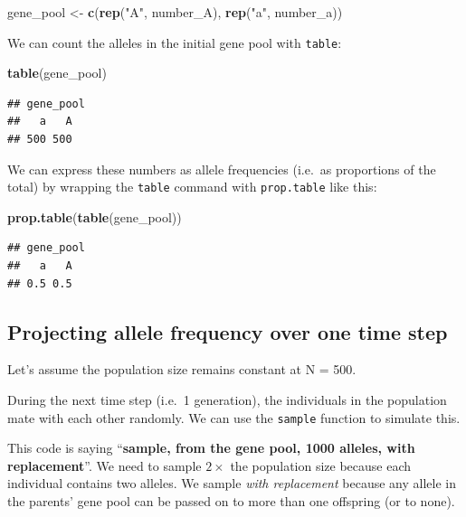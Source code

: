 \documentclass[
  a4paper]{book}
\newenvironment{Shaded}{\begin{snugshade}}{\end{snugshade}}
\newcommand{\FunctionTok}[1]{\textcolor[rgb]{0.13,0.29,0.53}{\textbf{#1}}}
\newcommand{\NormalTok}[1]{#1}
\newcommand{\OtherTok}[1]{\textcolor[rgb]{0.56,0.35,0.01}{#1}}
\newcommand{\StringTok}[1]{\textcolor[rgb]{0.31,0.60,0.02}{#1}}
\newcounter{none} %
\begin{document}
\begin{Shaded}
\begin{Highlighting}[]
\NormalTok{gene\_pool }\OtherTok{\textless{}{-}} \FunctionTok{c}\NormalTok{(}\FunctionTok{rep}\NormalTok{(}\StringTok{"A"}\NormalTok{, number\_A), }\FunctionTok{rep}\NormalTok{(}\StringTok{"a"}\NormalTok{, number\_a))}
\end{Highlighting}
\end{Shaded}

We can count the alleles in the initial gene pool with \texttt{table}:

\begin{Shaded}
\begin{Highlighting}[]
\FunctionTok{table}\NormalTok{(gene\_pool)}
\end{Highlighting}
\end{Shaded}

\begin{verbatim}
## gene_pool
##   a   A 
## 500 500
\end{verbatim}

We can express these numbers as allele frequencies (i.e.~as proportions of the total) by wrapping the \texttt{table} command with \texttt{prop.table} like this:

\begin{Shaded}
\begin{Highlighting}[]
\FunctionTok{prop.table}\NormalTok{(}\FunctionTok{table}\NormalTok{(gene\_pool))}
\end{Highlighting}
\end{Shaded}

\begin{verbatim}
## gene_pool
##   a   A 
## 0.5 0.5
\end{verbatim}

\subsection{Projecting allele frequency over one time step}\label{projecting-allele-frequency-over-one-time-step}

Let's assume the population size remains constant at N = 500.

During the next time step (i.e.~1 generation), the individuals in the population mate with each other randomly. We can use the \texttt{sample} function to simulate this.

This code is saying ``\textbf{sample, from the gene pool, 1000 alleles, with replacement}''. We need to sample \(2 \times\) the population size because each individual contains two alleles. We sample \emph{with replacement} because any allele in the parents' gene pool can be passed on to more than one offspring (or to none).
\end{document}
